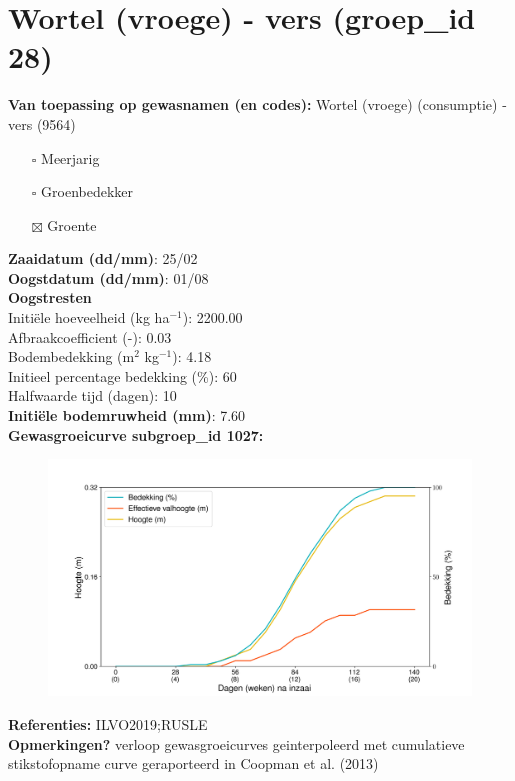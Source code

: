 \documentclass{article}
\begin{document}
 \section{Wortel (vroege)  - vers (groep\_id 28)} 
 \textbf{Van toepassing op gewasnamen (en codes):} Wortel (vroege) (consumptie) - vers (9564) 
 \begin{multicols}{3} \begin{itemize} \item[$\square$] Meerjarig \item[$\square$] Groenbedekker \item[$\boxtimes$] Groente \end{itemize} \end{multicols} 
  \textbf{Zaaidatum (dd/mm)}: 25/02  \vspace{0.10cm} \\ 
  \textbf{Oogstdatum (dd/mm)}: 01/08  \vspace{0.10cm} \\ 
  \textbf{Oogstresten} \vspace{0.05cm} \\ 
  \tab Initi\"{e}le hoeveelheid (kg ha$^{-1}$): 2200.00 \vspace{0.05cm} \\ 
  \tab Afbraakcoefficient (-): 0.03 \vspace{0.05cm} \\ 
  \tab Bodembedekking (m$^2$ kg$^{-1}$): 4.18 \vspace{0.05cm} \\ 
  \tab Initieel percentage bedekking (\%): 60 \vspace{0.05cm} \\ 
  \tab Halfwaarde tijd (dagen): 10 \vspace{0.05cm} \\ 
  \textbf{Initi\"{e}le bodemruwheid (mm)}: 7.60 \vspace{0.05cm} \\ 
  \textbf{Gewasgroeicurve subgroep\_id 1027:} 
 \begin{center} \begin{figure}[H] \includegraphics[width=12.5cm]{temp/1027.png} \end{figure} \end{center} 
  \textbf{Referenties:} ILVO2019;RUSLE \vspace{0.10cm} \\ 
  \textbf{Opmerkingen?} verloop gewasgroeicurves geinterpoleerd met cumulatieve stikstofopname curve geraporteerd in Coopman et al. (2013) \vspace{0.10cm} \\ 
 \newpage 
\end{document}
